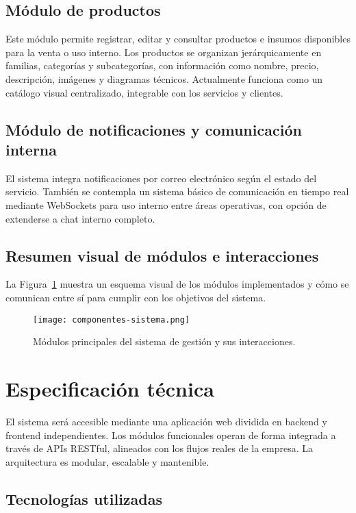 \subsection*{Módulo de productos}

Este módulo permite registrar, editar y consultar productos e insumos disponibles para la venta o uso interno. Los productos se organizan jerárquicamente en familias, categorías y subcategorías, con información como nombre, precio, descripción, imágenes y diagramas técnicos. Actualmente funciona como un catálogo visual centralizado, integrable con los servicios y clientes.

\subsection*{Módulo de notificaciones y comunicación interna}

El sistema integra notificaciones por correo electrónico según el estado del servicio. También se contempla un sistema básico de comunicación en tiempo real mediante WebSockets para uso interno entre áreas operativas, con opción de extenderse a chat interno completo.

\subsection*{Resumen visual de módulos e interacciones}

La Figura~\ref{fig:modulos} muestra un esquema visual de los módulos implementados y cómo se comunican entre sí para cumplir con los objetivos del sistema.

\begin{figure}[H]
	\centering
	\texttt{[image: componentes-sistema.png]}
	\caption{Módulos principales del sistema de gestión y sus interacciones.}
	\label{fig:modulos}
\end{figure}

	
\section{Especificación técnica}

El sistema será accesible mediante una aplicación web dividida en backend y frontend independientes. Los módulos funcionales operan de forma integrada a través de APIs RESTful, alineados con los flujos reales de la empresa. La arquitectura es modular, escalable y mantenible.

\subsection*{Tecnologías utilizadas}

